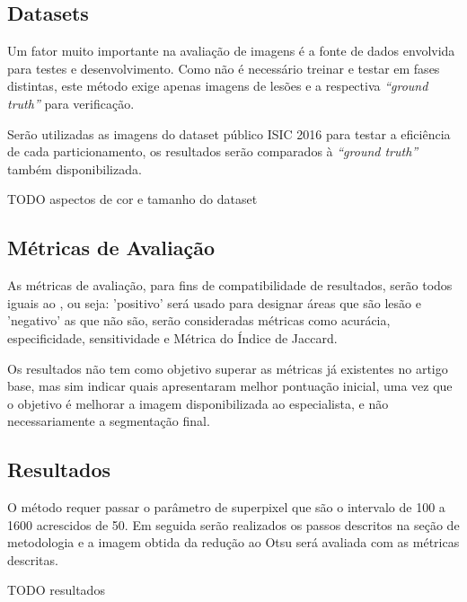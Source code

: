 \subsection{Datasets}

Um fator muito importante na avaliação de imagens é a fonte de dados envolvida para testes e desenvolvimento. Como não é necessário treinar e testar em fases distintas, este método exige apenas imagens de lesões e a respectiva \textit{``ground truth''} para verificação.

Serão utilizadas as imagens do dataset público ISIC 2016 \cite{isic2016} para testar a eficiência de cada particionamento, os resultados serão comparados à \textit{``ground truth''} também disponibilizada.

TODO aspectos de cor e tamanho do dataset

\subsection{Métricas de Avaliação}

As métricas de avaliação, para fins de compatibilidade de resultados, serão todos iguais ao \cite{santos2020skin}, ou seja: 'positivo' será usado para designar áreas que são lesão e 'negativo' as que não são, serão consideradas métricas como acurácia, especificidade, sensitividade e Métrica do Índice de Jaccard.

Os resultados não tem como objetivo superar as métricas já existentes no artigo base, mas sim indicar quais apresentaram melhor pontuação inicial, uma vez que o objetivo é melhorar a imagem disponibilizada ao especialista, e não necessariamente a segmentação final.

\subsection{Resultados}

O método requer passar o parâmetro de superpixel que são o intervalo de 100 a 1600 acrescidos de 50. Em seguida serão realizados os passos descritos na seção de metodologia e a imagem obtida da redução ao Otsu será avaliada com as métricas descritas.

TODO resultados
